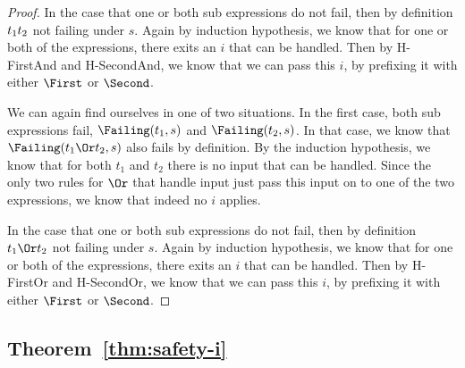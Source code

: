 \begin{proof}
{     In the case that one or both sub expressions do not fail, then by definition $t_1\relax t_2$ not failing under $s$.
     Again by induction hypothesis, we know that for one or both of the expressions, there exits an $i$ that can be handled.
     Then by H-FirstAnd and H-SecondAnd, we know that we can pass this $i$, by prefixing it with either $\First$ or $\Second$.}

     {We can again find ourselves in one of two situations.
     In the first case, both sub expressions fail, $\Failing(t_1,s)$ and $\Failing(t_2,s)$.
     In that case, we know that $\Failing(t_1\Or t_2,s)$ also fails by definition.
     By the induction hypothesis, we know that for both $t_1$ and $t_2$ there is no input that can be handled.
     Since the only two rules for $\Or$ that handle input just pass this input on to one of the two expressions, we know that indeed no $i$ applies.

     In the case that one or both sub expressions do not fail, then by definition $t_1\Or t_2$ not failing under $s$.
     Again by induction hypothesis, we know that for one or both of the expressions, there exits an $i$ that can be handled.
     Then by H-FirstOr and H-SecondOr, we know that we can pass this $i$, by prefixing it with either $\First$ or $\Second$.}

\end{proof}



\subsection{Theorem~\ref{thm:safety-i}}

